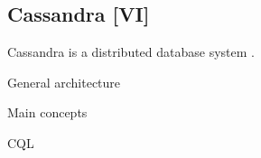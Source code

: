 \subsection{Cassandra [VI]}

Cassandra is a distributed database system \cite{Cassandra}.

General architecture

Main concepts

CQL